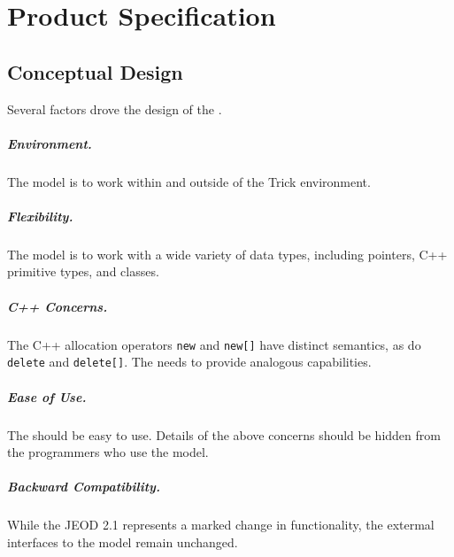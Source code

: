 %
% 

\chapter{Product Specification}
\label{ch:overview:spec}

\section{Conceptual Design}
Several factors drove the design of the \ModelDesc.

\paragraph{Environment.}
The model is to work within and outside of the Trick environment.

\paragraph{Flexibility.}
The model is to work with a wide variety of data types, including
pointers, C++ primitive types, and classes.

\paragraph{C++ Concerns.} The C++ allocation operators
\verb|new| and \verb|new[]| have distinct semantics,
as do \verb|delete| and \verb|delete[]|.
The \ModelDesc needs to provide analogous capabilities.

\paragraph{Ease of Use.} The \ModelDesc should be easy to use. Details of the
above concerns should be hidden from the programmers who use the model.

\paragraph{Backward Compatibility.} While the JEOD 2.1 \ModelDesc
represents a marked change in functionality, the extermal interfaces
to the model remain unchanged.


